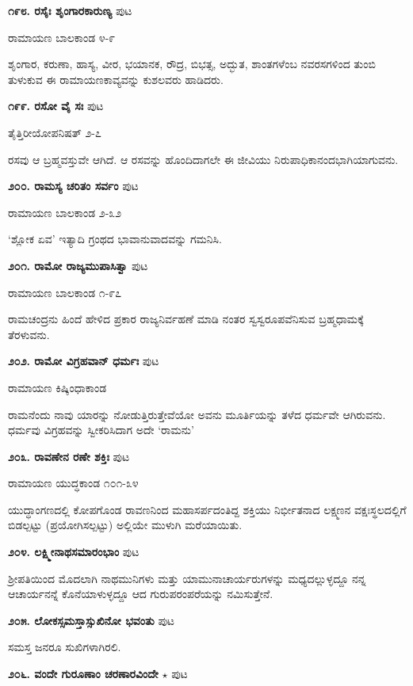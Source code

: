 \medskip
\noindent\textbf{೧೯೮. ರಸೈಃ ಶೃಂಗಾರಕಾರುಣ್ಯ} \hfill ಪುಟ \pageref{188}

\hfill ರಾಮಾಯಣ ಬಾಲಕಾಂಡ ೪-೯

ಶೃಂಗಾರ, ಕರುಣಾ, ಹಾಸ್ಯ, ವೀರ, ಭಯಾನಕ, ರೌದ್ರ, ಬಿಭತ್ಸ, ಅದ್ಭುತ, ಶಾಂತಗಳೆಂಬ ನವರಸಗಳಿಂದ ತುಂಬಿ ತುಳುಕುವ ಈ ರಾಮಾಯಣಕಾವ್ಯವನ್ನು ಕುಶಲವರು ಹಾಡಿದರು.

\medskip
\noindent\textbf{೧೯೯. ರಸೋ ವೈ ಸಃ} \hfill ಪುಟ \pageref{76c}

\hfill ತೈತ್ತಿರೀಯೋಪನಿಷತ್ ೨-೭

ರಸವು ಆ ಬ್ರಹ್ಮವಸ್ತುವೇ ಆಗಿದೆ. ಆ ರಸವನ್ನು ಹೊಂದಿದಾಗಲೇ ಈ ಜೀವಿಯು ನಿರುಪಾಧಿಕಾನಂದಭಾಗಿಯಾಗುವನು.

\medskip
\noindent\textbf{೨೦೦. ರಾಮಸ್ಯ ಚರಿತಂ ಸರ್ವಂ} \hfill ಪುಟ \pageref{204c}

\hfill ರಾಮಾಯಣ ಬಾಲಕಾಂಡ ೨-೩೨

`ಶ್ಲೋಕ ಏವ' ಇತ್ಯಾದಿ ಗ್ರಂಥದ ಭಾವಾನುವಾದವನ್ನು ಗಮನಿಸಿ.

\medskip
\noindent\textbf{೨೦೧. ರಾಮೋ ರಾಜ್ಯಮುಪಾಸಿತ್ವಾ} \hfill ಪುಟ \pageref{253a}

\hfill ರಾಮಾಯಣ ಬಾಲಕಾಂಡ ೧-೯೭

ರಾಮಚಂದ್ರನು ಹಿಂದೆ ಹೇಳಿದ ಪ್ರಕಾರ ರಾಜ್ಯನಿರ್ವಹಣೆ ಮಾಡಿ ನಂತರ ಸ್ವಸ್ವರೂಪವೆನಿಸುವ ಬ್ರಹ್ಮಧಾಮಕ್ಕೆ ತೆರಳುವನು.

\medskip
\noindent\textbf{೨೦೨. ರಾಮೋ ವಿಗ್ರಹವಾನ್ ಧರ್ಮಃ} \hfill ಪುಟ \pageref{247}

\hfill ರಾಮಾಯಣ ಕಿಷ್ಕಿಂಧಾಕಾಂಡ

ರಾಮನೆಂದು ನಾವು ಯಾರನ್ನು ನೋಡುತ್ತಿರುತ್ತೇವೆಯೋ ಅವನು ಮೂರ್ತಿಯನ್ನು ತಳೆದ ಧರ್ಮವೇ ಆಗಿರುವನು. ಧರ್ಮವು ವಿಗ್ರಹವನ್ನು ಸ್ವೀಕರಿಸಿದಾಗ ಅದೇ `ರಾಮನು'

\medskip
\noindent\textbf{೨೦೩. ರಾವಣೇನ ರಣೇ ಶಕ್ತಿಃ} \hfill ಪುಟ \pageref{120}

\hfill ರಾಮಾಯಣ ಯುದ್ಧಕಾಂಡ ೧೦೧-೩೪

ಯುದ್ಧಾಂಗಣದಲ್ಲಿ ಕೋಪಗೊಂಡ ರಾವಣನಿಂದ ಮಹಾಸರ್ಪದಂತಿದ್ದ ಶಕ್ತಿಯು ನಿರ್ಭೀತನಾದ ಲಕ್ಷ್ಮಣನ ವಕ್ಷಃಸ್ಥಲದಲ್ಲಿಗೆ ಬಿಡಲ್ಪಟ್ಟು (ಪ್ರಯೋಗಿಸಲ್ಪಟ್ಟು) ಅಲ್ಲಿಯೇ ಮುಳುಗಿ ಮರೆಯಾಯಿತು.

\medskip
\noindent\textbf{೨೦೪. ಲಕ್ಷ್ಮೀನಾಥಸಮಾರಂಭಾಂ} \hfill ಪುಟ \pageref{48b}

\hfill ಶ್ರೀಪತಿಯಿಂದ ಮೊದಲಾಗಿ ನಾಥಮುನಿಗಳು ಮತ್ತು ಯಾಮುನಾಚಾರ್ಯರುಗಳನ್ನು ಮಧ್ಯದಲ್ಲುಳ್ಳದ್ದೂ ನನ್ನ ಆಚಾರ್ಯನನ್ನೆ ಕೊನೆಯಾಳುಳ್ಳದ್ದೂ ಆದ ಗುರುಪರಂಪರೆಯನ್ನು ನಮಿಸುತ್ತೇನೆ.

\medskip
\noindent\textbf{೨೦೫. ಲೋಕಸ್ಸಮಸ್ತಾಸ್ಸುಖಿನೋ ಭವಂತು} \hfill ಪುಟ \pageref{193b}

\hfill ಸಮಸ್ತ ಜನರೂ ಸುಖಿಗಳಾಗಿರಲಿ.

\medskip
\noindent\textbf{೨೦೬. ವಂದೇ ಗುರೂಣಾಂ ಚರಣಾರವಿಂದೇ} $\star$ \hfill ಪುಟ \pageref{180a}

